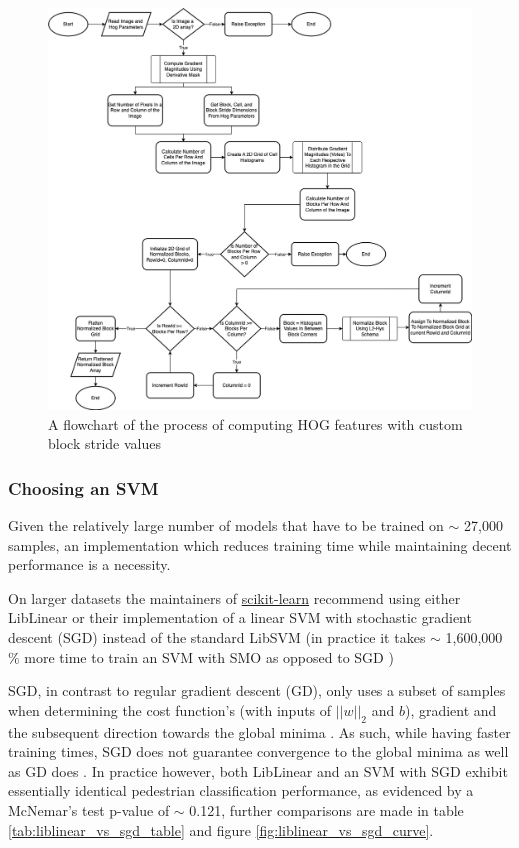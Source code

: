 \begin{figure}
    \centering
    \includegraphics[width=0.85\linewidth]{images/ee_hog.drawio.png}
    \caption{A flowchart of the process of computing HOG features with custom block stride values}
    \label{fig:hog_flowchart}
\end{figure}

\subsubsection{Choosing an SVM}\label{sec:svm_choice}

Given the relatively large number of models that have to be trained on $\sim$ 27,000 samples, an implementation which reduces training time while maintaining decent performance is a necessity.

On larger datasets the maintainers of \href{https://scikit-learn.org/}{scikit-learn} recommend using either LibLinear \cite{linearsvc} or their implementation of a linear SVM with stochastic gradient descent (SGD) \cite{sgdclassifier} instead of the standard LibSVM \cite{chang_lin_2011_libsvm} (in practice it takes $\sim$ 1,600,000 \% more time to train an SVM with SMO as opposed to SGD \cite{sgd_leon})

SGD, in contrast to regular gradient descent (GD), only uses a subset of samples when determining the cost function's (with inputs of $||w||_{2}$ and $b$), gradient and the subsequent direction towards the global minima \cite{uc_berkeley_sgd}. As such, while having faster training times, SGD does not guarantee convergence to the global minima as well as GD does \cite{uc_berkeley_sgd}. In practice however, both LibLinear and an SVM with SGD exhibit essentially identical pedestrian classification performance, as evidenced by a McNemar's test p-value of $\sim$ 0.121, further comparisons are made in table \ref{tab:liblinear_vs_sgd_table} and figure \ref{fig:liblinear_vs_sgd_curve}.

